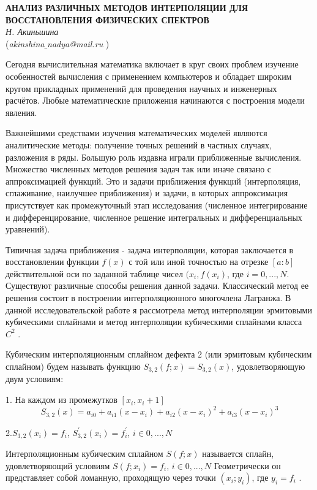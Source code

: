 \begin{center}{ \bf  АНАЛИЗ РАЗЛИЧНЫХ МЕТОДОВ ИНТЕРПОЛЯЦИИ ДЛЯ ВОССТАНОВЛЕНИЯ ФИЗИЧЕСКИХ СПЕКТРОВ}\\
{\it Н. Акиньшина } \\
({\it akinshina$\_$nadya@mail.ru} )
\end{center}

Сегодня вычислительная математика включает в круг своих проблем изучение особенностей вычисления с применением компьютеров и обладает широким кругом прикладных применений для проведения научных и инженерных расчётов. Любые математические приложения начинаются с построения модели явления.

Важнейшими средствами изучения математических моделей являются аналитические методы: получение точных решений в частных случаях, разложения в ряды. Большую роль издавна играли приближенные вычисления. Множество численных методов решения задач так или иначе связано с аппроксимацией функций. Это и задачи приближения функций (интерполяция, сглаживание, наилучшее приближения) и задачи, в которых аппроксимация присутствует как промежуточный этап исследования (численное интегрирование и дифференцирование, численное решение интегральных и дифференциальных уравнений).

Типичная задача приближения - задача интерполяции, которая заключается в восстановлении функции $f(x)$ с той или иной точностью на отрезке $[a:b]$ действительной оси по заданной таблице чисел $(x_i, f(x_i)$, где $i=0,...,N$. Существуют различные способы решения данной задачи. Классический метод ее решения состоит в построении интерполяционного многочлена Лагранжа.
В данной исследовательской работе я рассмотрела метод интерполяции эрмитовыми кубическими сплайнами и метод интерполяции кубическими сплайнами класса $C^2$ .

Кубическим интерполяционным сплайном дефекта 2 (или эрмитовым кубическим сплайном) будем называть функцию $S_{3,2}(f;x)=S_{3,2}(x)$, удовлетворяющую двум условиям:

1. На каждом из промежутков $[x_i,x_i+1]$
$$S_{3,2}(x)=a_{i0}+a_{i1}(x-x_i)+a_{i2}(x-x_i)^2+a_{i3}(x-x_i)^3$$

2.$S_{3,2}(x_i)=f_i$, $S_{3,2}^{'}(x_i)=f_i^{'}$, $i\in 0,...,N$

Интерполяционным кубическим сплайном $S(f;x)$  называется сплайн, удовлетворяющий условиям
 $S(f;x_i)=f_i$, $i\in 0,...,N$
 Геометрически он представляет собой ломанную, проходящую через точки $(x_i;y_i)$, где $y_i=f_i$ .

